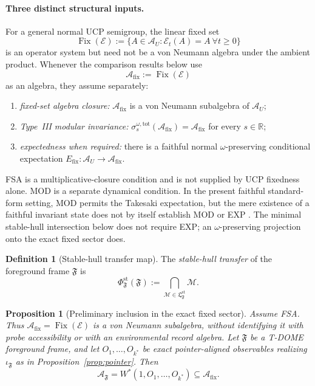 \documentclass[12pt]{article}
\newtheorem{proposition}[theorem]{Proposition}
\theoremstyle{definition}
\newtheorem{definition}[theorem]{Definition}
\theoremstyle{remark}
\begin{document}
\paragraph{Three distinct structural inputs.}
For a general normal UCP semigroup, the linear fixed set
\[
\operatorname{Fix}(\mathcal E)
:=
\{A\in\mathcal A_U:\mathcal E_t(A)=A\ \forall t\ge0\}
\]
is an operator system but need not be a von Neumann algebra under the
ambient product. Whenever the comparison results below use
\[
\mathcal A_{\mathrm{fix}}:=\operatorname{Fix}(\mathcal E)
\]
as an algebra, they assume separately:
\begin{enumerate}
\item[(FSA)] \emph{fixed-set algebra closure:}
  \(\mathcal A_{\mathrm{fix}}\) is a von Neumann subalgebra of
  \(\mathcal A_U\);
\item[(MOD)] \emph{Type~III modular invariance:}
  \(\sigma_s^{\omega,\mathrm{tot}}(\mathcal A_{\mathrm{fix}})
  =\mathcal A_{\mathrm{fix}}\) for every \(s\in\mathbb R\);
\item[(EXP)] \emph{expectedness when required:} there is a faithful
  normal \(\omega\)-preserving conditional expectation
  \(E_{\mathrm{fix}}:\mathcal A_U\to\mathcal A_{\mathrm{fix}}\).
\end{enumerate}
FSA is a multiplicative-closure condition and is not supplied by UCP
fixedness alone. MOD is a separate dynamical condition. In the present
faithful standard-form setting, MOD permits the Takesaki expectation,
but the mere existence of a faithful invariant state does not by itself
establish MOD or EXP \cite{Takesaki1972,FrigerioVerri1982}. The minimal
stable-hull intersection below does not require EXP; an
\(\omega\)-preserving projection onto the exact fixed sector does.

\begin{definition}[Stable-hull transfer map]\label{def:stablehull}
The \emph{stable-hull transfer} of the foreground frame
\(\mathfrak F\) is
\[
\Phi_{\mathfrak F}^{\mathrm{st}}(\mathfrak F)
:=
\bigcap_{\mathcal M\in \mathfrak L_{\mathfrak F}^{\mathrm{st}}}\mathcal M.
\]
\end{definition}

\begin{proposition}[Preliminary inclusion in the exact fixed sector]\label{prop:prelim_inclusion}
Assume FSA. Thus
\(\mathcal A_{\mathrm{fix}}=\operatorname{Fix}(\mathcal E)\) is a von
Neumann subalgebra, without identifying it with probe accessibility or
with an environmental record algebra.
Let \(\mathfrak F\) be a T-DOME foreground frame, and let
\(O_1,\dots,O_{k^*}\) be exact pointer-aligned observables realizing
\(\iota_{\mathfrak F}\) as in
Proposition~\ref{prop:pointer}. Then
\[
\mathcal A_{\mathfrak F}
=
W^*(1,O_1,\dots,O_{k^*})
\subseteq
\mathcal A_{\mathrm{fix}}.
\]
\end{proposition}
\end{document}
